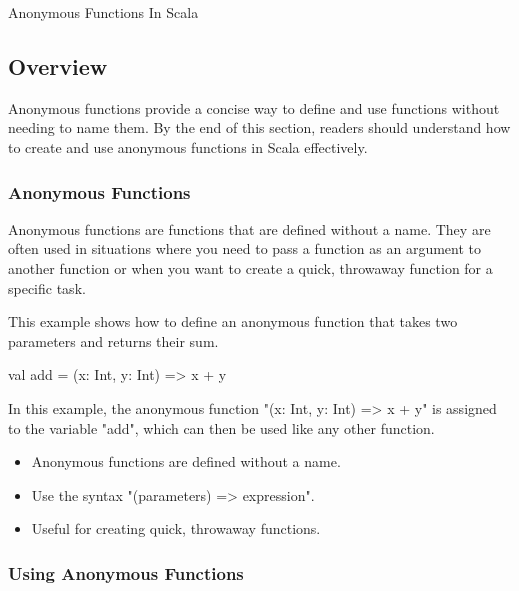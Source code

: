 \begin{notes}{Anonymous Functions In Scala}
    \subsection*{Overview}

    Anonymous functions provide a concise way to define and use functions without needing to name them. By the end of this section, readers should understand how to create and use anonymous functions in Scala effectively.
    
    \subsubsection*{Anonymous Functions}
    
    Anonymous functions are functions that are defined without a name. They are often used in situations where you need to pass a function as an argument to another function or when you want to create 
    a quick, throwaway function for a specific task.
    
    \begin{highlight}
    
        This example shows how to define an anonymous function that takes two parameters and returns their sum.
    
    \begin{code}[Scala]
    val add = (x: Int, y: Int) => x + y
    \end{code}
    
        In this example, the anonymous function "(x: Int, y: Int) => x + y" is assigned to the variable "add", which can then be used like any other function.
        
        \begin{itemize}
            \item Anonymous functions are defined without a name.
            \item Use the syntax "(parameters) => expression".
            \item Useful for creating quick, throwaway functions.
        \end{itemize}
    
    \end{highlight}
    
    \subsubsection*{Using Anonymous Functions}
    

\end{notes}
